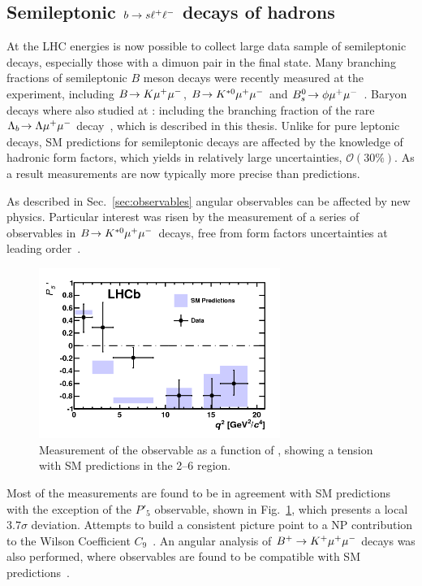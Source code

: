 \subsection{Semileptonic $b\rightarrow s\ell^+\ell^-$ decays of \bquark hadrons}

At the LHC energies is now possible to collect large data sample of semileptonic 
decays, especially those with a dimuon pair in the final state.
Many branching fractions of semileptonic $B$ meson decays were recently measured at
the \lhcb experiment, including $B\!\rightarrow K\mu^+\mu^-$, $B\!\rightarrow K^{*0}\mu^+\mu^-$
and $B^0_s\!\rightarrow \phi\mu^+\mu^-$~\cite{LHCB-PAPER-2013-017,LHCB-PAPER-2013-019,Aaij:2014pli}. 
Baryon decays where also studied at \lhcb: including the branching fraction of
the rare $\Lambda_b\!\rightarrow \Lambda\mu^+\mu^-$ decay~\cite{Aaij:2015xza}, which is described in this thesis.
Unlike for pure leptonic decays, SM predictions for semileptonic decays are affected by the
knowledge of hadronic form factors, which yields in relatively large uncertainties,
$\mathcal{O}(30\%)$. As a result measurements are now typically more precise than predictions.

As described in Sec.~\ref{sec:observables} angular observables can be affected by 
new physics. Particular interest was risen by the measurement of a series of observables in
$B\!\rightarrow K^{*0}\mu^+\mu^-$ decays, free from form factors uncertainties at leading order~\cite{LHCB-PAPER-2013-037}.
%
\begin{figure}[h!]
\centering
\includegraphics[width=0.7\textwidth]{Introduction/figs/P5prime.png}
\caption{Measurement of the observable as a function of \qsq, showing a tension with
SM predictions in the 2--6 \gevgevcccc region.}
\label{fig:P5prime}
\end{figure}
%
Most of the measurements are found to be in agreement with SM predictions
with the exception of the $P'_{5}$ observable, shown in Fig.~\ref{fig:P5prime}, which presents
a local $3.7\sigma$ deviation. Attempts to build a consistent picture point to a NP contribution
to the Wilson Coefficient $C_9$~\cite{Descotes-Genon:2013wba}.
An angular analysis of $B^+\rightarrow K^+\mu^+\mu^-$ decays was also performed, where observables
are found to be compatible with SM predictions~\cite{LHCB-PAPER-2014-007}.

